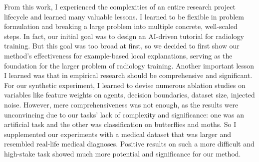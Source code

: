 From this work, I experienced the complexities of an entire research project lifecycle and learned many valuable lessons. I learned to be flexible in problem formulation and breaking a large problem into multiple concrete, well-scaled steps. In fact, our initial goal was to design an AI-driven tutorial for radiology training. But this goal was too broad at first, so we decided to first show our method's effectiveness for example-based local explanations, serving as the foundation for the larger problem of radiology training. Another important lesson I learned was that in empirical research should be comprehensive and significant. For our synthetic experiment, I learned to devise numerous ablation studies on variables like feature weights on agents, decision boundaries, dataset size, injected noise. However, mere comprehensiveness was not enough, as the results were unconvincing due to our tasks' lack of complexity and significance: one was an artificial task and the other was classification on butterflies and moths. So I supplemented our experiments with a medical dataset that was larger and resembled real-life medical diagnoses. Positive results on such a more difficult and high-stake task showed much more potential and significance for our method.






